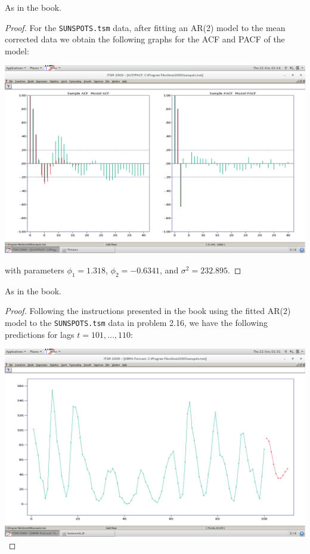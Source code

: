 \documentclass[12pt]{article}
\theoremstyle{definition}
\newenvironment{custompbm}[1]
  {\renewcommand\theproblem{#1}\problem}
  {\endproblem}
\begin{document}
\begin{custompbm}{2.16}
  As in the book.
\end{custompbm}

\begin{proof}
  For the \texttt{SUNSPOTS.tsm} data, after fitting an AR(2) model to the mean corrected
  data we obtain the following graphs for the ACF and PACF of the model:

  \vskip 3mm
  \includegraphics{acf_pacf}

  with parameters $\phi_1 = 1.318$, $\phi_2 = -0.6341$, and $\sigma^2 = 232.895$.
\end{proof}


\begin{custompbm}{2.17}
  As in the book.
\end{custompbm}

\begin{proof}
  Following the instructions presented in the book using the fitted AR(2) model to
  the \texttt{SUNSPOTS.tsm} data in problem 2.16, we have the following predictions
  for lags $t = 101, \dots, 110$:

  \vskip 3mm
  \includegraphics{forecast}
\end{proof}
\end{document}
